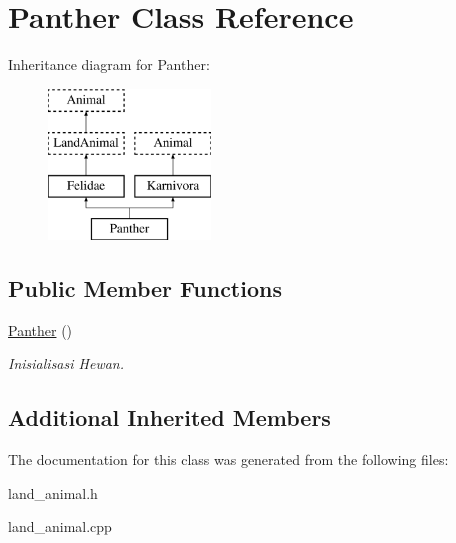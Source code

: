 \hypertarget{class_panther}{}\section{Panther Class Reference}
\label{class_panther}
Inheritance diagram for Panther\+:\begin{figure}[H]
\begin{center}
\leavevmode
\includegraphics[height=4.000000cm]{class_panther}
\end{center}
\end{figure}
\subsection*{Public Member Functions}
\begin{DoxyCompactItemize}
\item 
\hyperlink{class_panther_a657230a132f912152e1ec77924232345}{Panther} ()\hypertarget{class_panther_a657230a132f912152e1ec77924232345}{}\label{class_panther_a657230a132f912152e1ec77924232345}

\begin{DoxyCompactList}\small\item\em Inisialisasi Hewan. \end{DoxyCompactList}\end{DoxyCompactItemize}
\subsection*{Additional Inherited Members}


The documentation for this class was generated from the following files\+:\begin{DoxyCompactItemize}
\item 
land\+\_\+animal.\+h\item 
land\+\_\+animal.\+cpp\end{DoxyCompactItemize}
